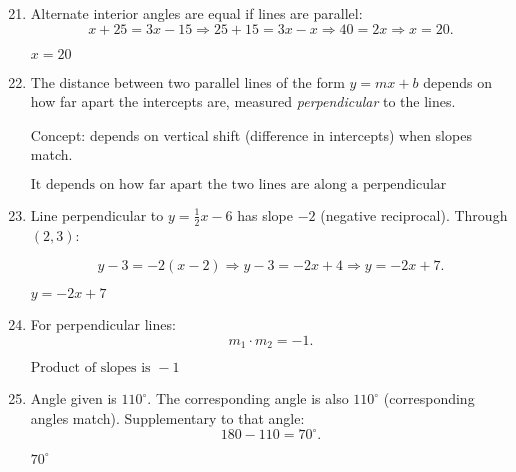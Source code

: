 \documentclass[12pt]{article}
\begin{document}
\begin{enumerate}
  \setcounter{enumi}{20}
  \item Alternate interior angles are equal if lines are parallel:
  \[
  x + 25 = 3x - 15
  \Rightarrow 25 + 15 = 3x - x
  \Rightarrow 40 = 2x
  \Rightarrow x = 20.
  \]

  \(\boxed{x = 20}\)

  \item The distance between two parallel lines of the form \(y = mx + b\) depends on how far apart the intercepts are, measured \textit{perpendicular} to the lines.

  Concept: depends on vertical shift (difference in intercepts) when slopes match.

  \(\boxed{\text{It depends on how far apart the two lines are along a perpendicular}}\)

  \item Line perpendicular to \(y = \tfrac{1}{2}x - 6\) has slope \(-2\) (negative reciprocal).  
  Through \((2,3)\):

  \[
  y - 3 = -2(x - 2)
  \Rightarrow y - 3 = -2x + 4
  \Rightarrow y = -2x + 7.
  \]

  \(\boxed{y = -2x + 7}\)

  \item For perpendicular lines:
  \[
  m_1 \cdot m_2 = -1.
  \]

  \(\boxed{\text{Product of slopes is } -1}\)

  \item Angle given is \(110^\circ.\) The corresponding angle is also \(110^\circ\) (corresponding angles match).  
  Supplementary to that angle:
  \[
  180 - 110 = 70^\circ.
  \]

  \(\boxed{70^\circ}\)
\end{enumerate}
\end{document}
